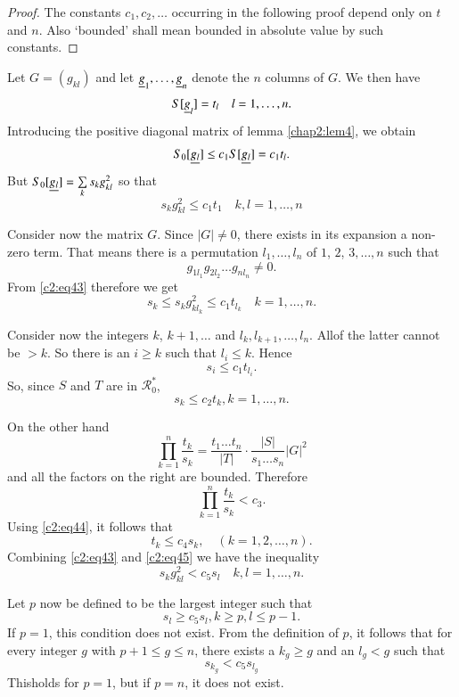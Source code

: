 \begin{proof}
The constants $c_{1},c_{2},\ldots$ occurring in the following proof
depend only on $t$ and $n$. Also `bounded' shall mean bounded in
absolute value by such constants.
\end{proof}

Let $G=(g_{kl})$ and let $\underline{g}_{1},\ldots,\underline{g}_{n}$ denote the $n$
columns of $G$. We then have 
$$
S[\underline{g}_{l}]=t_{l}\quad l=1,\ldots,n.
$$
Introducing the positive diagonal matrix of lemma \ref{chap2:lem4}, we
obtain
$$
S_{0}[\underline{g_{l}}]\leq c_{1}S[\underline{g_{l}}]=c_{1}t_{l}.
$$
But $S_{0}[\underline{g_{l}}]=\sum\limits_{k}s_{k}g^{2}_{kl}$ so that
\begin{equation*}
s_{k}g^{2}_{kl}\leq c_{1}t_{1}\quad k,l=1,\ldots,n\tag{43}\label{c2:eq43}
\end{equation*}

Consider now the matrix $G$. Since $|G|\neq 0$, there exists in its
expansion a non-zero term. That means there is a permutation
$l_{1},\ldots,l_{n}$ of $1$, $2$, $3,\ldots,n$ such that
$$
g_{1l_{1}}g_{2l_{2}}\ldots g_{nl_{n}}\neq 0.
$$
From \eqref{c2:eq43} therefore we get
$$
s_{k}\leq s_{k}g^{2}_{kl_{k}}\leq c_{1}t_{l_{k}}\quad k=1,\ldots,n.
$$

Consider now the integers $k$, $k+1,\ldots$ and
$l_{k},l_{k+1},\ldots,l_{n}$. All\pageoriginale of the latter cannot
be $>k$. So there is an $i\geq k$ such that $l_{i}\leq k$. Hence
$$
s_{i}\leq c_{1}t_{l_{i}}.
$$
So, since $S$ and $T$ are in $\mathscr{R}^{\ast}_{0}$,
\begin{equation*}
s_{k}\leq c_{2}t_{k},k=1,\ldots,n.\tag{44}\label{c2:eq44}
\end{equation*}

On the other hand
$$
\prod^{n}_{k=1}\frac{t_{k}}{s_{k}}=\frac{t_{1}\ldots t_{n}}{|T|}\cdot
\frac{|S|}{s_{1}\ldots s_{n}}|G|^{2} 
$$
and all the factors on the right are bounded. Therefore
$$
\prod^{n}_{k=1}\frac{t_{k}}{s_{k}}<c_{3}.
$$
Using \eqref{c2:eq44}, it follows that
\begin{equation*}
t_{k}\leq c_{4}s_{k},\quad (k=1,2,\ldots,n).\tag{45}\label{c2:eq45}
\end{equation*}
Combining \eqref{c2:eq43} and \eqref{c2:eq45} we have the inequality
\begin{equation*}
s_{k}g^{2}_{kl}<c_{5}s_{l}\quad k,l=1,\ldots,n.\tag{46}\label{c2:eq46}
\end{equation*}

Let $p$ now be defined to be the largest integer such that
\begin{equation*}
s_{l}\geq c_{5}s_{l}, k\geq p, l\leq p-1.\tag{47}\label{c2:eq47}
\end{equation*}
If $p=1$, this condition does not exist. From the definition of $p$,
it follows that for every integer $g$ with $p+1\leq g\leq n$, there
exists a $k_{g}\geq g$ and an $l_{g}<g$ such that
\begin{equation*}
s_{k_{g}}<c_{5}s_{l_{g}}\tag{48}\label{c2:eq48}
\end{equation*}
This\pageoriginale holds for $p=1$, but if $p=n$, it does not exist.

